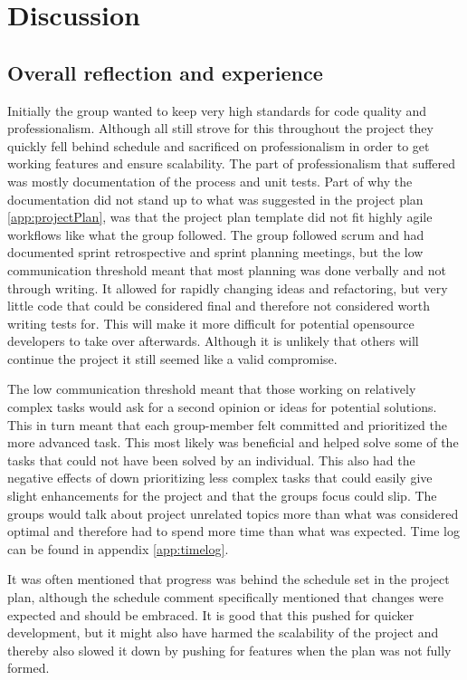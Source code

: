 \chapter{Discussion}
\label{chap:discussion}

\section{Overall reflection and experience}

Initially the group wanted to keep very high standards for code quality and professionalism. Although all still strove for this throughout the project they quickly fell behind schedule and sacrificed on professionalism in order to get working features and ensure scalability. The part of professionalism that suffered was mostly documentation of the process and unit tests. Part of why the documentation did not stand up to what was suggested in the project plan \ref{app:projectPlan}, was that the project plan template did not fit highly \gls{agile} workflows like what the group followed. The group followed \gls{scrum} and had documented sprint retrospective and sprint planning meetings, but the low communication threshold meant that most planning was done verbally and not through writing. It allowed for rapidly changing ideas and refactoring, but very little code that could be considered final and therefore not considered worth writing tests for. This will make it more difficult for potential \gls{opensource} developers to take over afterwards. Although it is unlikely that others will continue the project it still seemed like a valid compromise.

The low communication threshold meant that those working on relatively complex tasks would ask for a second opinion or ideas for potential solutions. This in turn meant that each group-member felt committed and prioritized the more advanced task. This most likely was beneficial and helped solve some of the tasks that could not have been solved by an individual. This also had the negative effects of down prioritizing less complex tasks that could easily give slight enhancements for the project and that the groups focus could slip. The groups would talk about project unrelated topics more than what was considered optimal and therefore had to spend more time than what was expected. Time log can be found in appendix \ref{app:timelog}.

It was often mentioned that progress was behind the schedule set in the project plan, although the schedule comment specifically mentioned that changes were expected and should be embraced. It is good that this pushed for quicker development, but it might also have harmed the scalability of the project and thereby also slowed it down by pushing for features when the plan was not fully formed.

